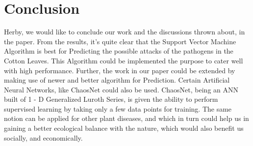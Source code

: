 \documentclass[conference]{IEEEtran}
\begin{document}
\section{Conclusion}
Herby, we would like to conclude our work and the discussions thrown about, in the paper. From the results, it's quite clear that the Support Vector Machine Algorithm is best for Predicting the possible attacks of the pathogens in the Cotton Leaves. This Algorithm could be implemented the purpose to cater well with high performance. Further, the work in our paper could be extended by making use of newer and better algorithm for Prediction. Certain Artificial Neural Networks, like ChaosNet could also be used. ChaosNet, being an ANN built of 1 - D Generalized Luroth Series, is given the ability to perform supervised learning by taking only a few data points for training. The same notion can be applied for other plant diseases, and which in turn could help us in gaining a better ecological balance with the nature, which would also benefit us socially, and economically. 
\end{document}
